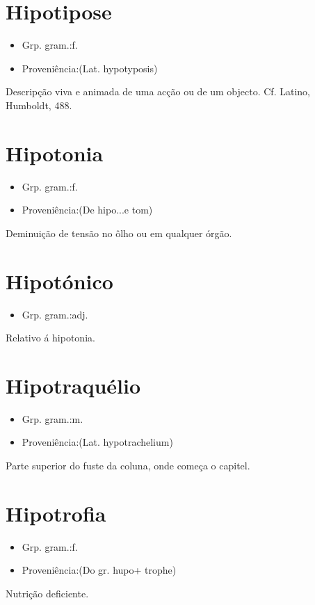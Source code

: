 \documentclass{article}
\begin{document}
\section{Hipotipose}
\begin{itemize}
\item {Grp. gram.:f.}
\end{itemize}
\begin{itemize}
\item {Proveniência:(Lat. \textunderscore hypotyposis\textunderscore )}
\end{itemize}
Descripção viva e animada de uma acção ou de um objecto. Cf. Latino, \textunderscore Humboldt\textunderscore , 488.
\section{Hipotonia}
\begin{itemize}
\item {Grp. gram.:f.}
\end{itemize}
\begin{itemize}
\item {Proveniência:(De \textunderscore hipo...\textunderscore  e \textunderscore tom\textunderscore )}
\end{itemize}
Deminuição de tensão no ôlho ou em qualquer órgão.
\section{Hipotónico}
\begin{itemize}
\item {Grp. gram.:adj.}
\end{itemize}
Relativo á hipotonia.
\section{Hipotraquélio}
\begin{itemize}
\item {Grp. gram.:m.}
\end{itemize}
\begin{itemize}
\item {Proveniência:(Lat. \textunderscore hypotrachelium\textunderscore )}
\end{itemize}
Parte superior do fuste da coluna, onde começa o capitel.
\section{Hipotrofia}
\begin{itemize}
\item {Grp. gram.:f.}
\end{itemize}
\begin{itemize}
\item {Proveniência:(Do gr. \textunderscore hupo\textunderscore  + \textunderscore trophe\textunderscore )}
\end{itemize}
Nutrição deficiente.
\end{document}
